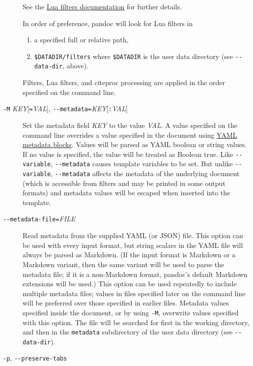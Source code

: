 \documentclass[
]{article}
\begin{document}
\begin{description}
See the \href{https://pandoc.org/lua-filters.html}{Lua filters
documentation} for further details.

In order of preference, pandoc will look for Lua filters in

\begin{enumerate}
\def\labelenumi{\arabic{enumi}.}
\item
  a specified full or relative path,
\item
  \texttt{\$DATADIR/filters} where \texttt{\$DATADIR} is the user data
  directory (see \texttt{-\/-data-dir}, above).
\end{enumerate}

Filters, Lua filters, and citeproc processing are applied in the order
specified on the command line.
\item[\texttt{-M} \emph{KEY}{[}\texttt{=}\emph{VAL}{]},
\texttt{-\/-metadata=}\emph{KEY}{[}\texttt{:}\emph{VAL}{]}]
Set the metadata field \emph{KEY} to the value \emph{VAL}. A value
specified on the command line overrides a value specified in the
document using \protect\hyperlink{extension-yaml_metadata_block}{YAML
metadata blocks}. Values will be parsed as YAML boolean or string
values. If no value is specified, the value will be treated as Boolean
true. Like \texttt{-\/-variable}, \texttt{-\/-metadata} causes template
variables to be set. But unlike \texttt{-\/-variable},
\texttt{-\/-metadata} affects the metadata of the underlying document
(which is accessible from filters and may be printed in some output
formats) and metadata values will be escaped when inserted into the
template.
\item[\texttt{-\/-metadata-file=}\emph{FILE}]
Read metadata from the supplied YAML (or JSON) file. This option can be
used with every input format, but string scalars in the YAML file will
always be parsed as Markdown. (If the input format is Markdown or a
Markdown variant, then the same variant will be used to parse the
metadata file; if it is a non-Markdown format, pandoc's default Markdown
extensions will be used.) This option can be used repeatedly to include
multiple metadata files; values in files specified later on the command
line will be preferred over those specified in earlier files. Metadata
values specified inside the document, or by using \texttt{-M}, overwrite
values specified with this option. The file will be searched for first
in the working directory, and then in the \texttt{metadata} subdirectory
of the user data directory (see \texttt{-\/-data-dir}).
\item[\texttt{-p}, \texttt{-\/-preserve-tabs}]

\end{description}
\end{document}
